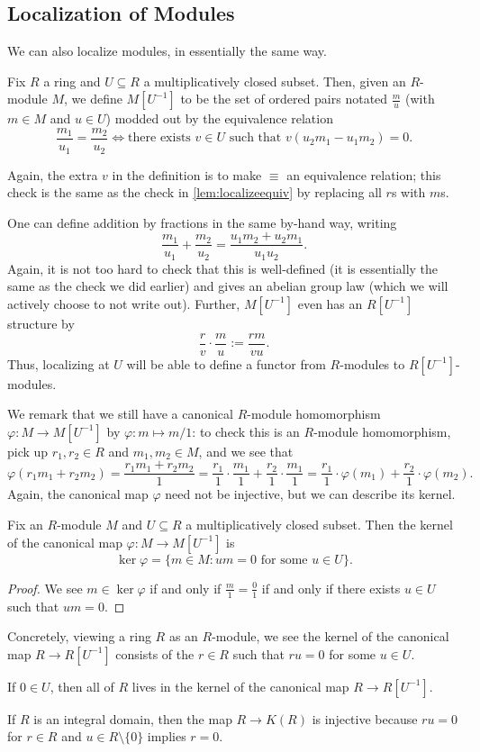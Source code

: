 \documentclass[../notes.tex]{subfiles}
\begin{document}
\subsection{Localization of Modules}
We can also localize modules, in essentially the same way.
\begin{definition}
	Fix $R$ a ring and $U\subseteq R$ a multiplicatively closed subset. Then, given an $R$-module $M$, we define $M\left[U^{-1}\right]$ to be the set of ordered pairs notated $\frac mu$ (with $m\in M$ and $u\in U$) modded out by the equivalence relation
	\[\frac{m_1}{u_1}=\frac{m_2}{u_2}\iff\text{there exists }v\in U\text{ such that }v(u_2m_1-u_1m_2)=0.\]
\end{definition}
Again, the extra $v$ in the definition is to make $\equiv$ an equivalence relation; this check is the same as the check in \autoref{lem:localizeequiv} by replacing all $r$s with $m$s.

One can define addition by fractions in the same by-hand way, writing
\[\frac{m_1}{u_1}+\frac{m_2}{u_2}=\frac{u_1m_2+u_2m_1}{u_1u_2}.\]
Again, it is not too hard to check that this is well-defined (it is essentially the same as the check we did earlier) and gives an abelian group law (which we will actively choose to not write out). Further, $M\left[U^{-1}\right]$ even has an $R\left[U^{-1}\right]$ structure by
\[\frac rv\cdot\frac mu:=\frac{rm}{vu}.\]
Thus, localizing at $U$ will be able to define a functor from $R$-modules to $R\left[U^{-1}\right]$-modules.

We remark that we still have a canonical $R$-module homomorphism $\varphi:M\to M\left[U^{-1}\right]$ by $\varphi:m\mapsto m/1$: to check this is an $R$-module homomorphism, pick up $r_1,r_2\in R$ and $m_1,m_2\in M$, and we see that
\[\varphi(r_1m_1+r_2m_2)=\frac{r_1m_1+r_2m_2}1=\frac{r_1}1\cdot\frac{m_1}1+\frac{r_2}1\cdot\frac{m_1}1=\frac{r_1}1\cdot\varphi(m_1)+\frac{r_2}1\cdot\varphi(m_2).\]
Again, the canonical map $\varphi$ need not be injective, but we can describe its kernel.
\begin{lemma}
	Fix an $R$-module $M$ and $U\subseteq R$ a multiplicatively closed subset. Then the kernel of the canonical map $\varphi:M\to M\left[U^{-1}\right]$ is
	\[\ker\varphi=\{m\in M:um=0\text{ for some }u\in U\}.\]
\end{lemma}
\begin{proof}
	We see $m\in\ker\varphi$ if and only if $\frac m1=\frac01$ if and only if there exists $u\in U$ such that $um=0$.
\end{proof}
Concretely, viewing a ring $R$ as an $R$-module, we see the kernel of the canonical map $R\to R\left[U^{-1}\right]$ consists of the $r\in R$ such that $ru=0$ for some $u\in U$.
\begin{example}
	If $0\in U$, then all of $R$ lives in the kernel of the canonical map $R\to R\left[U^{-1}\right]$.
\end{example}
\begin{example} \label{ex:intdomainlocalinject}
	If $R$ is an integral domain, then the map $R\to K(R)$ is injective because $ru=0$ for $r\in R$ and $u\in R\setminus\{0\}$ implies $r=0$.
\end{example}
\end{document}
